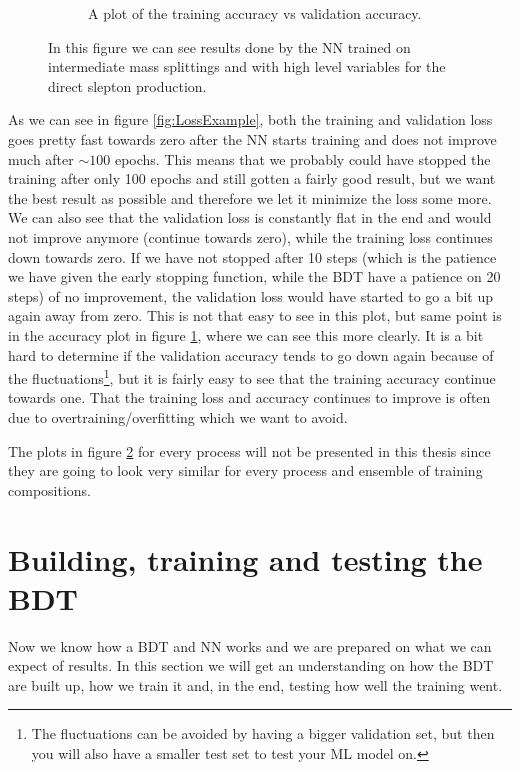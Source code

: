 \begin{figure}[H]
\begin{subfigure}[t!]{0.49\textwidth}
        \caption{A plot of the training accuracy vs validation accuracy.}
        \label{fig:AccExample}
    \end{subfigure}
    \caption{In this figure we can see results done by the NN trained on intermediate mass splittings and with high level variables for the direct slepton production.}
    \label{fig:resLossAccExample}
\end{figure}

As we can see in figure \ref{fig:LossExample}, both the training and validation loss goes pretty fast towards zero after the NN starts training and does not improve much after $\sim 100$ epochs. This means that we probably could have stopped the training after only 100 epochs and still gotten a fairly good result, but we want the best result as possible and therefore we let it minimize the loss some more. We can also see that the validation loss is constantly flat in the end and would not improve anymore (continue towards zero), while the training loss continues down towards zero. If we have not stopped after 10 steps (which is the patience we have given the early stopping function, while the BDT have a patience on 20 steps) of no improvement, the validation loss would have started to go a bit up again away from zero. This is not that easy to see in this plot, but same point is in the accuracy plot in figure \ref{fig:AccExample}, where we can see this more clearly. It is a bit hard to determine if the validation accuracy tends to go down again because of the fluctuations\footnote{The fluctuations can be avoided by having a bigger validation set, but then you will also have a smaller test set to test your ML model on.}, but it is fairly easy to see that the training accuracy continue towards one. That the training loss and accuracy continues to improve is often due to overtraining/overfitting which we want to avoid.

The plots in figure \ref{fig:resLossAccExample} for every process will not be presented in this thesis since they are going to look very similar for every process and ensemble of training compositions.


\section{Building, training and testing the BDT}
Now we know how a BDT and NN works and we are prepared on what we can expect of results. In this section we will get an understanding on how the BDT are built up, how we train it and, in the end, testing how well the training went.

